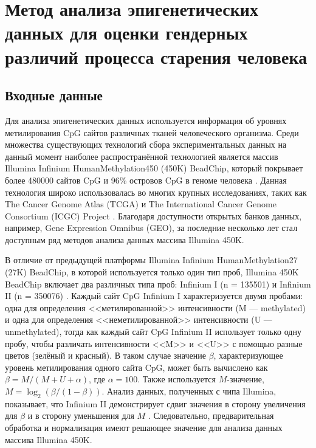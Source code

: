 \chapter{Метод анализа эпигенетических данных для оценки гендерных различий процесса старения человека}\label{ch:ch2}

\section{Входные данные}\label{sec:ch2/sec1}

Для анализа эпигенетических данных используется информация об уровнях метилирования CpG сайтов различных тканей человеческого организма. Среди множества существующих технологий сбора экспериментальных данных на данный момент наиболее распространённой технологией является массив Illumina Infinium HumanMethylation450 (450K) BeadChip, который покрывает более 480000 сайтов CpG и 96\% островов CpG в геноме человека \autocite{Bibikova2011}. Данная технология широко использовалась во многих крупных исследованиях, таких как The Cancer Genome Atlas (TCGA) и The International Cancer Genome Consortium (ICGC) Project \autocite{ICGC2010}. Благодаря доступности открытых банков данных, например, Gene Expression Omnibus (GEO), за последние несколько лет стал доступным ряд методов анализа данных массива Illumina 450K.

В отличие от предыдущей платформы Illumina Infinium HumanMethylation27 (27K) BeadChip, в которой используется только один тип проб, Illumina 450K BeadChip включает два различных типа проб: Infinium I (n = 135501) и Infinium II (n = 350076) \autocite{Bibikova2011}. Каждый сайт CpG Infinium I характеризуется двумя пробами: одна для определения <<метилированной>> интенсивности (M --- methylated) и одна для определения <<неметилированной>> интенсивности (U --- unmethylated), тогда как каждый сайт CpG Infinium II использует только одну пробу, чтобы различать интенсивности <<M>> и <<U>> с помощью разные цветов (зелёный и красный). В таком случае значение $\beta$, характеризующее уровень метилирования одного сайта CpG, может быть вычислено как $\beta = M / (M + U + \alpha)$, где $\alpha = 100$. Также используется $M$-значение, $M = \log_2 (\beta / (1-\beta))$. Анализ данных, полученных с чипа Illumina, показывает, что Infinium II демонстрирует сдвиг значения в сторону увеличения для $\beta$ и в сторону уменьшения для $M$ \autocite{Dedeurwaerder2011}. Следовательно, предварительная обработка и нормализация имеют решающее значение для анализа данных массива Illumina 450K. 

